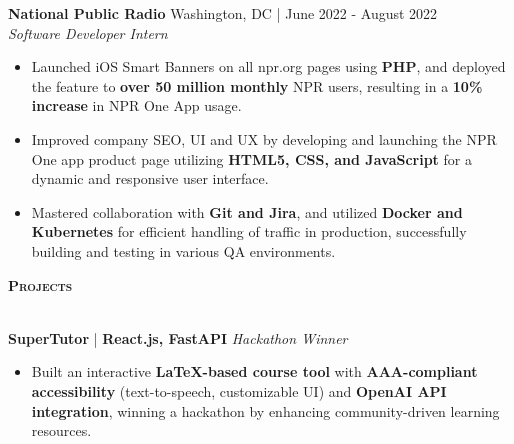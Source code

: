 \documentclass[10pt]{article}
\newcommand{\lineunder} {
    \vspace*{-8pt} \\
    \hspace*{-18pt} \hrulefill \\
}
\newcommand{\header} [1] {
    {\hspace*{-15pt}\vspace*{3pt} \textsc{#1}}
    \vspace*{-2pt} \lineunder
}
\begin{document}
\textbf{National Public Radio}     \hfill Washington, DC | June 2022 - August 2022\\
\textit{Software Developer Intern}\\
\vspace{-1mm}
\begin{itemize}[leftmargin=5mm, itemsep=0mm]
  
  \item Launched iOS Smart Banners on all npr.org pages using \textbf{PHP}, and deployed the feature to \textbf{over 50 million monthly} NPR users, resulting in a \textbf{10\% increase} in NPR One App usage.
  \item Improved company SEO, UI and UX by developing and launching the NPR One app product page utilizing \textbf{HTML5, CSS, and JavaScript} for a dynamic and responsive user interface.
  \item Mastered collaboration with \textbf{Git and Jira}, and utilized \textbf{Docker and Kubernetes} for efficient handling of traffic in production, successfully building and testing in various QA environments.
\end{itemize}


\header{\textbf{Projects}}
\vspace{0.5mm}






\textbf{SuperTutor} | \textbf{React.js, FastAPI} \hfill \textit{Hackathon Winner}  
\vspace{-1mm}  
\begin{itemize}[leftmargin=5mm, itemsep=0mm]  
  \item Built an interactive \textbf{LaTeX-based course tool} with \textbf{AAA-compliant accessibility} (text-to-speech, customizable UI) and \textbf{OpenAI API integration}, winning a hackathon by enhancing community-driven learning resources.  
\end{itemize}  
\end{document}
